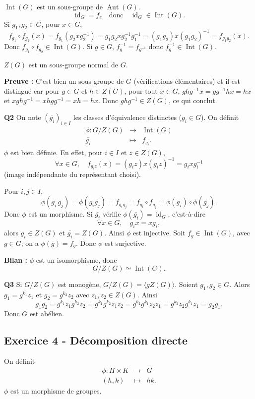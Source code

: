 \documentclass[11pt,a4paper]{article}
\begin{document}
$\operatorname{Int}(G)$ est un sous-groupe de $\operatorname{Aut}(G)$.
\[
\operatorname{id}_G=f_e\quad\text{donc}\quad \operatorname{id}_G\in\operatorname{Int}(G).
\]
Si $g_1,g_2\in G$, pour $x\in G$,
\[
f_{g_1}\circ f_{g_2}(x)=f_{g_1}(g_2xg_2^{-1})=g_1g_2xg_2^{-1}g_1^{-1}=(g_1g_2)x(g_1g_2)^{-1}=f_{g_1g_2}(x).
\]
Donc $f_{g_1}\circ f_{g_2}\in\operatorname{Int}(G)$. Si $g\in G$, $f_g^{-1}=f_{g^{-1}}$ donc $f_g^{-1}\in\operatorname{Int}(G)$.

$Z(G)$ est un sous-groupe normal de $G$.

\textbf{Preuve :} C'est bien un sous-groupe de $G$ (vérifications élémentaires) et il est distingué car pour $g\in G$ et $h\in Z(G)$, pour tout $x\in G$, $ghg^{-1}x=gg^{-1}hx=hx$ et $xghg^{-1}=xhgg^{-1}=xh=hx$. Donc $ghg^{-1}\in Z(G)$, ce qui conclut.

\textbf{Q2} On note $(\overline{g_i})_{i\in I}$ les classes d'équivalence distinctes ($g_i\in G$). On définit
\[
\begin{array}{rcl}
\phi:G/Z(G)&\longrightarrow&\operatorname{Int}(G)\\
\overline{g_i}&\longmapsto&f_{g_i}.
\end{array}
\]
$\phi$ est bien définie. En effet, pour $i\in I$ et $z\in Z(G)$,
\[
\forall x\in G,\quad f_{g_iz}(x)=(g_iz)x(g_iz)^{-1}=g_ixg_i^{-1}
\]
(image indépendante du représentant choisi).

Pour $i,j\in I$,
\[
\phi(\overline{g_i}\,\overline{g_j})=\phi(\overline{g_ig_j})=f_{g_ig_j}=f_{g_i}\circ f_{g_j}=\phi(\overline{g_i})\circ\phi(\overline{g_j}).
\]
Donc $\phi$ est un morphisme. Si $\overline{g_i}$ vérifie $\phi(\overline{g_i})=\operatorname{id}_G$, c'est-à-dire
\[
\forall x\in G,\quad g_ix=xg_i,
\]
alors $g_i\in Z(G)$ et $\overline{g_i}=Z(G)$. Ainsi $\phi$ est injective. Soit $f_g\in\operatorname{Int}(G)$, avec $g\in G$; on a $\phi(\overline g)=f_g$. Donc $\phi$ est surjective.

\textbf{Bilan :} $\phi$ est un isomorphisme, donc
\[
G/Z(G)\simeq\operatorname{Int}(G).
\]

\textbf{Q3} Si $G/Z(G)$ est monogène, $G/Z(G)=\langle gZ(G)\rangle$. Soient $g_1,g_2\in G$. Alors $g_1=g^{k_1}z_1$ et $g_2=g^{k_2}z_2$ avec $z_1,z_2\in Z(G)$. Ainsi
\[
g_1g_2=g^{k_1}z_1g^{k_2}z_2=g^{k_1}g^{k_2}z_1z_2=g^{k_2}g^{k_1}z_2z_1=g^{k_2}z_2g^{k_1}z_1=g_2g_1.
\]
Donc $G$ est abélien.

\subsection*{Exercice 4 - Décomposition directe}
On définit
\[
\begin{array}{rcl}
\phi:H\times K&\longrightarrow&G\\
(h,k)&\longmapsto&hk.
\end{array}
\]
$\phi$ est un morphisme de groupes.
\end{document}
